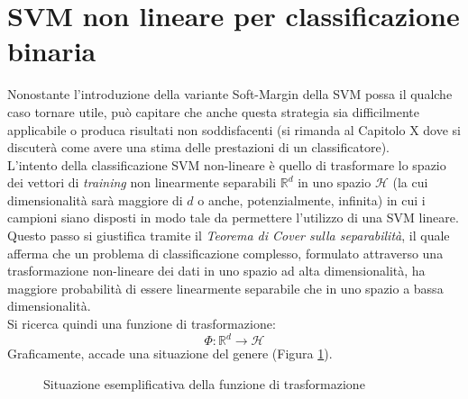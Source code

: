 \section{SVM non lineare per classificazione binaria}
Nonostante l'introduzione della variante Soft-Margin della SVM possa il qualche caso tornare utile, può capitare che anche questa strategia sia difficilmente applicabile o produca risultati non soddisfacenti (si rimanda al Capitolo X dove si discuterà come avere una stima delle prestazioni di un classificatore).
\\

L'intento della classificazione SVM non-lineare è quello di trasformare lo spazio dei vettori di \emph{training} non linearmente separabili $\mathbb{R}^d$ in uno spazio $\mathcal{H}$ (la cui dimensionalità sarà maggiore di $d$ o anche, potenzialmente, infinita) in cui i campioni siano disposti in modo tale da permettere l'utilizzo di una SVM lineare. Questo passo si giustifica tramite il \emph{Teorema di Cover sulla separabilità}, il quale afferma che un problema di classificazione complesso, formulato attraverso una trasformazione non-lineare dei dati in uno spazio ad alta dimensionalità, ha maggiore probabilità di essere linearmente separabile che in uno spazio a bassa dimensionalità.
\\
Si ricerca quindi una funzione di trasformazione:
\begin{equation}
\label{eq:funzione_di_trasformazione}
\Phi:\mathbb{R}^d\rightarrow\mathcal{H}
\end{equation}
Graficamente, accade una situazione del genere (Figura \ref{fig:funzione_di_trasformazione}).
 \begin{figure}[!ht]
    \caption{Situazione esemplificativa della funzione di trasformazione}
    \label{fig:funzione_di_trasformazione}
  \end{figure}
